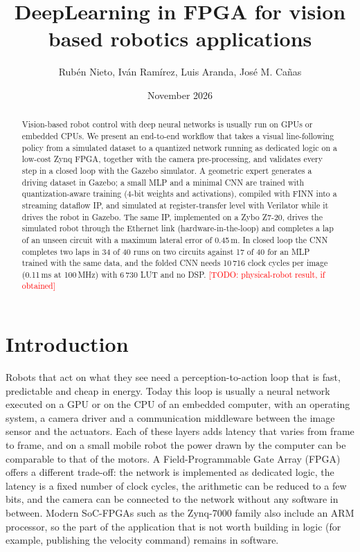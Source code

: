 \documentclass{article}
\title{DeepLearning in FPGA for vision based robotics applications}
\author{Rubén Nieto, Iván Ramírez, Luis Aranda, José M. Cañas}
\date{November 2026}
\newcommand{\TODO}[1]{\textcolor{red}{[TODO: #1]}}
\begin{document}
\maketitle

\begin{abstract}
Vision-based robot control with deep neural networks is usually run on GPUs or embedded CPUs. We present an end-to-end workflow that
takes a visual line-following policy from a simulated dataset to a quantized network running as dedicated logic on a low-cost Zynq
FPGA, together with the camera pre-processing, and validates every step in a closed loop with the Gazebo simulator.
A geometric expert generates a driving dataset in Gazebo; a small MLP and a minimal CNN are trained with quantization-aware training
(4-bit weights and activations), compiled with FINN into a streaming dataflow IP, and simulated at register-transfer level with
Verilator while it drives the robot in Gazebo. The same IP, implemented on a Zybo Z7-20, drives the simulated robot through the
Ethernet link (hardware-in-the-loop) and completes a lap of an unseen circuit with a maximum lateral error of 0.45\,m.
In closed loop the CNN completes two laps in 34 of 40 runs on two circuits against 17 of 40 for an MLP trained with the same data, and
the folded CNN needs 10\,716 clock cycles per image (0.11\,ms at 100\,MHz) with 6\,730 LUT and no DSP.
\TODO{physical-robot result, if obtained}
\end{abstract}

\section{Introduction}
Robots that act on what they see need a perception-to-action loop that is fast, predictable and cheap in energy. Today this loop is usually
a neural network executed on a GPU or on the CPU of an embedded computer, with an operating system, a camera driver and a communication
middleware between the image sensor and the actuators. Each of these layers adds latency that varies from frame to frame, and on a small
mobile robot the power drawn by the computer can be comparable to that of the motors. A Field-Programmable Gate Array (FPGA) offers a different
trade-off: the network is implemented as dedicated logic, the latency is a fixed number of clock cycles, the arithmetic can be reduced to a few
bits, and the camera can be connected to the network without any software in between. Modern SoC-FPGAs such as the Zynq-7000 family also include
an ARM processor, so the part of the application that is not worth building in logic (for example, publishing the velocity command) remains in software.
\end{document}
